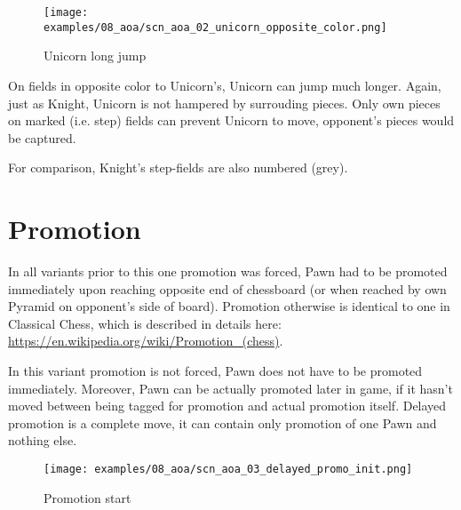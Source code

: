 \clearpage %

\noindent
\begin{figure}[!h]
\texttt{[image: examples/08\_aoa/scn\_aoa\_02\_unicorn\_opposite\_color.png]}
\caption{Unicorn long jump}
\label{fig:scn_aoa_02_unicorn_opposite_color}
\end{figure}

On fields in opposite color to Unicorn's, Unicorn can jump much longer.
Again, just as Knight, Unicorn is not hampered by surrouding pieces.
Only own pieces on marked (i.e. step) fields can prevent Unicorn to move,
opponent's pieces would be captured.

For comparison, Knight's step-fields are also numbered (grey).

\clearpage %

\section*{Promotion}
\label{sec:Age of Aquarius/Promotion}

In all variants prior to this one promotion was forced, Pawn had to be
promoted immediately upon reaching opposite end of chessboard (or when
reached by own Pyramid on opponent's side of board). Promotion otherwise
is identical to one in Classical Chess, which is described in details here: \\
\href{https://en.wikipedia.org/wiki/Promotion\_(chess)}{https://en.wikipedia.org/wiki/Promotion\_(chess)}.

In this variant promotion is not forced, Pawn does not have to be promoted
immediately. Moreover, Pawn can be actually promoted later in game, if it
hasn't moved between being tagged for promotion and actual promotion itself.
Delayed promotion is a complete move, it can contain only promotion of one
Pawn and nothing else.

\clearpage %

\noindent
\begin{figure}[h]
\texttt{[image: examples/08\_aoa/scn\_aoa\_03\_delayed\_promo\_init.png]}
\caption{Promotion start}
\label{fig:scn_aoa_03_delayed_promo_init}
\end{figure}

